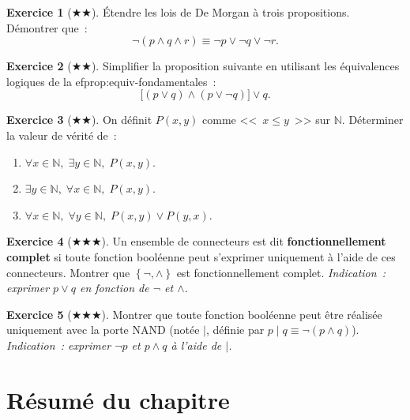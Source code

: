 \documentclass[12pt,a4paper,openany]{book}
\theoremstyle{definition}
\newtheorem{exercice}{Exercice}[chapter]
\theoremstyle{plain}
\theoremstyle{remark}
\newcommand{\N}{\mathbb{N}}
\newcommand{\set}[1]{\left\{#1\right\}}
\begin{document}
\begin{exercice}[$\bigstar\bigstar$]\label{exo:de-morgan-3}
  \'Etendre les lois de De Morgan \`a trois propositions. D\'emontrer que~:
  \[
    \neg(p \land q \land r) \equiv \neg p \lor \neg q \lor \neg r.
  \]
\end{exercice}

\begin{exercice}[$\bigstar\bigstar$]\label{exo:equivalences}
  Simplifier la proposition suivante en utilisant les \'equivalences logiques de la 
ef{prop:equiv-fondamentales}~:
  \[
    \bigl[(p \lor q) \land (p \lor \neg q)\bigr] \lor q.
  \]
\end{exercice}

\begin{exercice}[$\bigstar\bigstar$]\label{exo:quantif-ordre}
  On d\'efinit $P(x,y)$ comme <<~$x \leq y$~>> sur $\N$. D\'eterminer la valeur de v\'erit\'e de~:
  \begin{enumerate}[label=(\alph*)]
    \item $\forall x \in \N,\; \exists y \in \N,\; P(x,y)$.
    \item $\exists y \in \N,\; \forall x \in \N,\; P(x,y)$.
    \item $\forall x \in \N,\; \forall y \in \N,\; P(x,y) \lor P(y,x)$.
  \end{enumerate}
\end{exercice}

\begin{exercice}[$\bigstar\bigstar\bigstar$]\label{exo:systeme-complet}
  Un ensemble de connecteurs est dit \textbf{fonctionnellement complet} si toute fonction bool\'eenne peut s'exprimer uniquement \`a l'aide de ces connecteurs. Montrer que $\set{\neg, \land}$ est fonctionnellement complet.
  \textit{Indication~: exprimer $p \lor q$ en fonction de $\neg$ et $\land$.}
\end{exercice}

\begin{exercice}[$\bigstar\bigstar\bigstar$]\label{exo:nand-universel}
  Montrer que toute fonction bool\'eenne peut \^etre r\'ealis\'ee uniquement avec la porte NAND (not\'ee $\mid$, d\'efinie par $p \mid q \equiv \neg(p \land q)$).
  \textit{Indication~: exprimer $\neg p$ et $p \land q$ \`a l'aide de $\mid$.}
\end{exercice}

\section*{R\'esum\'e du chapitre}
\end{document}
